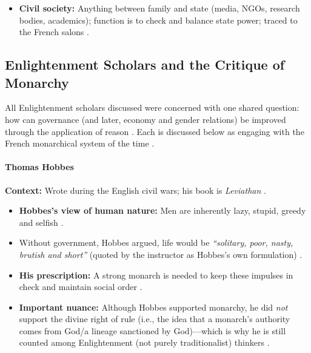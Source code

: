 \begin{QuickRevision}
\begin{itemize}
    \item \textbf{Civil society:} Anything between family and state (media, NGOs, research bodies, academics); function is to check and balance state power; traced to the French salons .
\end{itemize}
\end{QuickRevision}

\subsection{Enlightenment Scholars and the Critique of Monarchy}
All Enlightenment scholars discussed were concerned with one shared question: how can governance (and later, economy and gender relations) be improved through the application of reason . Each is discussed below as engaging with the French monarchical system of the time .

\paragraph{Thomas Hobbes}
\begin{KeyConcept}
\textbf{Context:} Wrote during the English civil wars; his book is \textit{Leviathan} .
\begin{itemize}
    \item \textbf{Hobbes's view of human nature:} Men are inherently lazy, stupid, greedy and selfish .
    \item Without government, Hobbes argued, life would be \textit{``solitary, poor, nasty, brutish and short''} (quoted by the instructor as Hobbes's own formulation) .
    \item \textbf{His prescription:} A strong monarch is needed to keep these impulses in check and maintain social order .
    \item \textbf{Important nuance:} Although Hobbes supported monarchy, he did \textit{not} support the divine right of rule (i.e., the idea that a monarch's authority comes from God/a lineage sanctioned by God)---which is why he is still counted among Enlightenment (not purely traditionalist) thinkers .
\end{itemize}
\end{KeyConcept}

